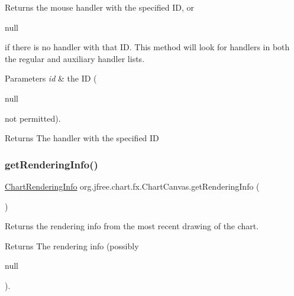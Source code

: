 Returns the mouse handler with the specified ID, or
\begin{DoxyCode}
null 
\end{DoxyCode}
 if there is no handler with that ID. This method will look for handlers in both the regular and auxiliary handler lists.


\begin{DoxyParams}{Parameters}
{\em id} & the ID (
\begin{DoxyCode}
null 
\end{DoxyCode}
 not permitted).\\
\hline
\end{DoxyParams}
\begin{DoxyReturn}{Returns}
The handler with the specified ID 
\end{DoxyReturn}
\mbox{\label{classorg_1_1jfree_1_1chart_1_1fx_1_1_chart_canvas_ad6f987f516ea5f7b3cff5e3b7d9e47ae}} 
\subsubsection{\texorpdfstring{get\+Rendering\+Info()}{getRenderingInfo()}}
{\footnotesize\ttfamily \mbox{\hyperlink{classorg_1_1jfree_1_1chart_1_1_chart_rendering_info}{Chart\+Rendering\+Info}} org.\+jfree.\+chart.\+fx.\+Chart\+Canvas.\+get\+Rendering\+Info (\begin{DoxyParamCaption}{ }\end{DoxyParamCaption})}

Returns the rendering info from the most recent drawing of the chart.

\begin{DoxyReturn}{Returns}
The rendering info (possibly
\begin{DoxyCode}
null 
\end{DoxyCode}
 ). 
\end{DoxyReturn}
\mbox{\label{classorg_1_1jfree_1_1chart_1_1fx_1_1_chart_canvas_ae45402ed4f5a0686ef1139aa4aa805ee}} 
